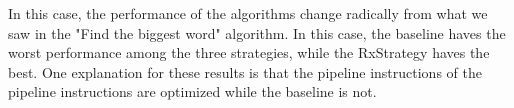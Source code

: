 In this case, the performance of the algorithms change radically from what we saw in the "Find the biggest word" algorithm. In this case, the baseline haves the worst performance among the three strategies, while the RxStrategy haves the best. 
One explanation for these results is that the pipeline instructions of the pipeline instructions are optimized while the baseline is not. 

\clearpage


